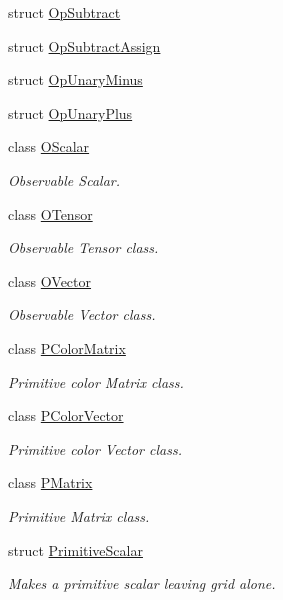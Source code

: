 \begin{DoxyCompactItemize}
struct \mbox{\hyperlink{structENSEM_1_1OpSubtract}{Op\+Subtract}}
\item 
struct \mbox{\hyperlink{structENSEM_1_1OpSubtractAssign}{Op\+Subtract\+Assign}}
\item 
struct \mbox{\hyperlink{structENSEM_1_1OpUnaryMinus}{Op\+Unary\+Minus}}
\item 
struct \mbox{\hyperlink{structENSEM_1_1OpUnaryPlus}{Op\+Unary\+Plus}}
\item 
class \mbox{\hyperlink{classENSEM_1_1OScalar}{O\+Scalar}}
\begin{DoxyCompactList}\small\item\em Observable Scalar. \end{DoxyCompactList}\item 
class \mbox{\hyperlink{classENSEM_1_1OTensor}{O\+Tensor}}
\begin{DoxyCompactList}\small\item\em Observable Tensor class. \end{DoxyCompactList}\item 
class \mbox{\hyperlink{classENSEM_1_1OVector}{O\+Vector}}
\begin{DoxyCompactList}\small\item\em Observable Vector class. \end{DoxyCompactList}\item 
class \mbox{\hyperlink{classENSEM_1_1PColorMatrix}{P\+Color\+Matrix}}
\begin{DoxyCompactList}\small\item\em Primitive color Matrix class. \end{DoxyCompactList}\item 
class \mbox{\hyperlink{classENSEM_1_1PColorVector}{P\+Color\+Vector}}
\begin{DoxyCompactList}\small\item\em Primitive color Vector class. \end{DoxyCompactList}\item 
class \mbox{\hyperlink{classENSEM_1_1PMatrix}{P\+Matrix}}
\begin{DoxyCompactList}\small\item\em Primitive Matrix class. \end{DoxyCompactList}\item 
struct \mbox{\hyperlink{structENSEM_1_1PrimitiveScalar}{Primitive\+Scalar}}
\begin{DoxyCompactList}\small\item\em Makes a primitive scalar leaving grid alone. \end{DoxyCompactList}\item 

\end{DoxyCompactItemize}
